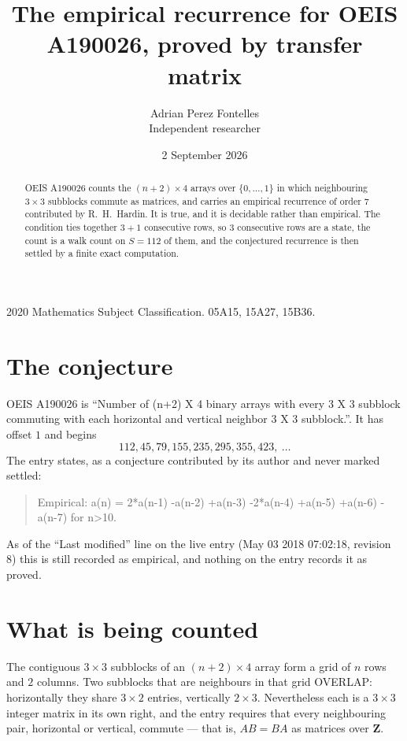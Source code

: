 \documentclass[11pt,a4paper]{article}
\title{The empirical recurrence for OEIS A190026, proved by transfer matrix}
\author{Adrian Perez Fontelles\\ \small Independent researcher}
\date{2 September 2026}
\theoremstyle{plain}
\theoremstyle{definition}
\begin{document}
\maketitle

\begin{abstract}
OEIS A190026 counts the $(n+2)\times4$ arrays over $\{0,\dots,1\}$ in which
neighbouring $3\times3$ subblocks commute as matrices, and carries an empirical recurrence
of order $7$ contributed by R.~H.~Hardin. It is true, and it is decidable rather than
empirical. The condition ties together $3+1$ consecutive rows, so $3$ consecutive rows are
a state, the count is a walk count on $S=112$ of them, and the conjectured recurrence is then
settled by a finite exact computation.
\end{abstract}

\noindent\small 2020 Mathematics Subject Classification. 05A15, 15A27, 15B36.\normalsize

\section{The conjecture}

OEIS A190026 is ``Number of (n+2) X 4 binary arrays with every 3 X 3 subblock commuting with each horizontal and vertical neighbor 3 X 3 subblock.''. It has offset $1$ and begins
\[
112, 45, 79, 155, 235, 295, 355, 423,\ \dots
\]
The entry states, as a conjecture contributed by its author and never marked settled:
\begin{quote}
Empirical: a(n) = 2*a(n-1) -a(n-2) +a(n-3) -2*a(n-4) +a(n-5) +a(n-6) -a(n-7) for n>10.
\end{quote}
As of the ``Last modified'' line on the live entry (May 03 2018 07:02:18, revision 8) this is still
recorded as empirical, and nothing on the entry records it as proved.

\section{What is being counted}

The contiguous $3\times3$ subblocks of an $(n+2)\times4$ array form a grid of $n$
rows and $2$ columns. Two subblocks that are neighbours in that
grid OVERLAP: horizontally they share $3\times2$ entries, vertically
$2\times3$. Nevertheless each is a $3\times3$ integer matrix in its own right, and
the entry requires that every neighbouring pair, horizontal or vertical, commute --- that is,
$AB=BA$ as matrices over $\mathbf{Z}$.
\end{document}
